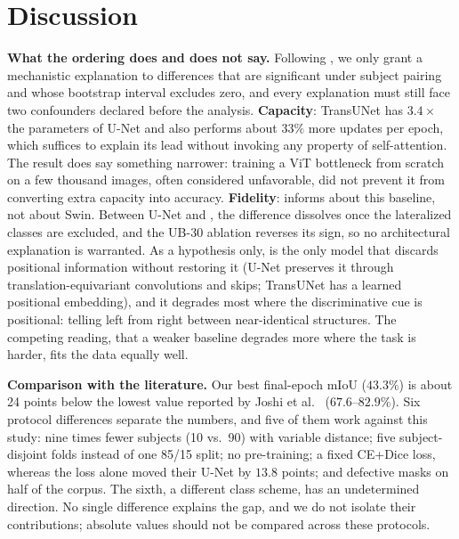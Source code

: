 \section{Discussion} \label{sec:discussao}

\textbf{What the ordering does and does not say.}
Following \cite{Isensee2024}, we only grant a mechanistic explanation to differences that are significant under subject pairing and whose bootstrap interval excludes zero, and every explanation must still face two confounders declared before the analysis.
\textbf{Capacity}: TransUNet has $3.4\times$ the parameters of U-Net and also performs about $33\%$ more updates per epoch, which suffices to explain its lead without invoking any property of self-attention.
The result does say something narrower: training a ViT bottleneck from scratch on a few thousand images, often considered unfavorable, did not prevent it from converting extra capacity into accuracy.
\textbf{Fidelity}: \swinp{} informs about this baseline, not about Swin.
Between U-Net and \swinp{}, the difference dissolves once the lateralized classes are excluded, and the UB-30 ablation reverses its sign, so no architectural explanation is warranted.
As a hypothesis only, \swinp{} is the only model that discards positional information without restoring it (U-Net preserves it through translation-equivariant convolutions and skips; TransUNet has a learned positional embedding), and it degrades most where the discriminative cue is positional: telling left from right between near-identical structures.
The competing reading, that a weaker baseline degrades more where the task is harder, fits the data equally well.

\textbf{Comparison with the literature.}
Our best final-epoch mIoU ($43.3\%$) is about 24 points below the lowest value reported by Joshi et al.~\cite{Joshi2022} ($67.6$--$82.9\%$).
Six protocol differences separate the numbers, and five of them work against this study: nine times fewer subjects (10 vs.\ 90) with variable distance; five subject-disjoint folds instead of one 85/15 split; no pre-training; a fixed CE+Dice loss, whereas the loss alone moved their U-Net by $13.8$ points; and defective masks on half of the corpus.
The sixth, a different class scheme, has an undetermined direction.
No single difference explains the gap, and we do not isolate their contributions; absolute values should not be compared across these protocols.

